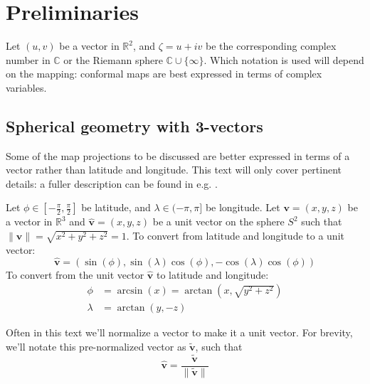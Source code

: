 \documentclass{amsart}[12pt]
\begin{document}
\section{Preliminaries}
Let $(u,v)$ be a vector in $\mathbb R^2$, and $\zeta = u + i v$ be the
corresponding complex number in $\mathbb C$ or the Riemann sphere $\mathbb C
\cup \{\infty\}$. Which notation is used will depend on the mapping:
conformal maps are best expressed in terms of complex variables.

\subsection{Spherical geometry with 3-vectors}
Some of the map projections to be discussed are better expressed
in terms of a vector rather than latitude and longitude. This text will only
cover pertinent details: a fuller description can be found in e.g. \cite{gade}.

Let $\phi \in [-\frac{\pi}{2}, \frac{\pi}{2}]$ be latitude, and
$\lambda \in (-\pi, \pi]$ be longitude. Let $\mathbf v = (x, y, z)$ be a vector
in $\mathbb R^3$ and $\mathbf{\hat{v}} = (x, y, z)$ be a unit vector on the
sphere $S^2$ such that $\| \mathbf{\hat{v}} \| = \sqrt{x^2 + y^2 +z^2} = 1$.
To convert from latitude and longitude to a unit vector:
\begin{equation}
  \mathbf{\hat{v}} = \left(\sin (\phi), \sin (\lambda) \cos (\phi),
  -\cos (\lambda) \cos (\phi) \right)
\end{equation}
To convert from the unit vector $\mathbf{\hat{v}}$ to latitude and longitude:
\begin{equation}\begin{split}
  \phi &= \arcsin (x) = \arctan (x, \sqrt{y^2 + z^2}) \\
  \lambda &= \arctan (y, -z)
\end{split}\end{equation}

Often in this text we'll normalize a vector to make it a unit vector.
For brevity,
we'll notate this pre-normalized vector as $\mathbf{\widetilde{v}}$, such that
\begin{equation}
  \mathbf{\hat{v}} = \frac{\mathbf{\widetilde{v}}}{\|\mathbf{\widetilde{v}}\|}
\end{equation}
\end{document}
